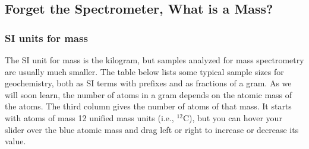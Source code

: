 \documentclass[
  letterpaper,
  DIV=11,
  numbers=noendperiod]{scrreprt}
\begin{document}
\subsection{Forget the Spectrometer, What is a
Mass?}\label{forget-the-spectrometer-what-is-a-mass}

\subsubsection{SI units for mass}\label{si-units-for-mass}

The SI unit for mass is the kilogram, but samples analyzed for mass
spectrometry are usually much smaller. The table below lists some
typical sample sizes for geochemistry, both as SI terms with prefixes
and as fractions of a gram. As we will soon learn, the number of atoms
in a gram depends on the atomic mass of the atoms. The third column
gives the number of atoms of that mass. It starts with atoms of mass 12
unified mass units (i.e., \(^{12}\)C), but you can hover your slider
over the blue atomic mass and drag left or right to increase or decrease
its value.
\end{document}
